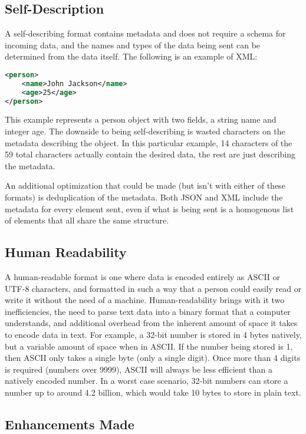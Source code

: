 \documentclass[conference]{IEEEtran}
\begin{document}
\subsection{Self-Description}

A self-describing format contains metadata and does not require a schema for incoming data, and the names and types of the data being sent can be determined from the data itself. The following is an example of XML:

\begin{lstlisting}[language=XML]
<person>
	<name>John Jackson</name>
	<age>25</age>
</person>
\end{lstlisting}

This example represents a person object with two fields, a string name and integer age. The downside to being self-describing is wasted characters on the metadata describing the object. In this particular example, 14 characters of the 59 total characters actually contain the desired data, the rest are just describing the metadata.

An additional optimization that could be made (but isn't with either of these formats) is deduplication of the metadata. Both JSON and XML include the metadata for every element sent, even if what is being sent is a homogenous list of elements that all share the same structure.

\subsection{Human Readability}

A human-readable format is one where data is encoded entirely as ASCII or UTF-8 characters, and formatted in such a way that a person could easily read or write it without the need of a machine. Human-readability brings with it two inefficiencies, the need to parse text data into a binary format that a computer understands, and additional overhead from the inherent amount of space it takes to encode data in text. For example, a 32-bit number is stored in 4 bytes natively, but a variable amount of space when in ASCII. If the number being stored is 1, then ASCII only takes a single byte (only a single digit). Once more than 4 digits is required (numbers over 9999), ASCII will always be less efficient than a natively encoded number. In a worst case scenario, 32-bit numbers can store a number up to around 4.2 billion, which would take 10 bytes to store in plain text.

\subsection{Enhancements Made}
\end{document}
